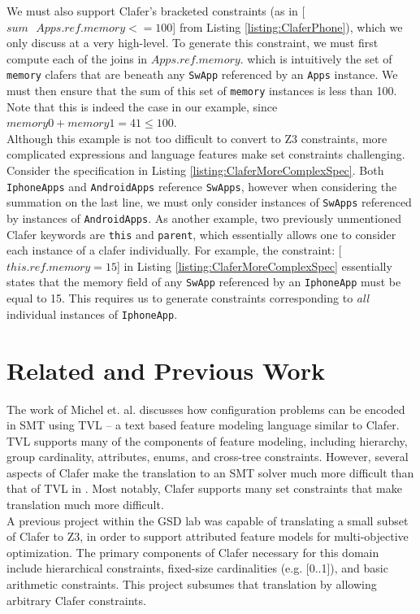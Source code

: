 \documentclass{article}
\begin{document}
We must also support Clafer's bracketed constraints (as in [$sum\text{ }Apps.ref.memory <= 100$] from Listing \ref{listing:ClaferPhone}), which we only discuss at a very high-level. To generate this constraint, we must first compute each of the joins in $Apps.ref.memory$. which is intuitively the set of \texttt{memory} clafers that are beneath any \texttt{SwApp} referenced by an \texttt{Apps} instance. We must then ensure that the sum of this set of \texttt{memory} instances is less than 100. Note that this is indeed the case in our example, since $memory0 + memory1 =   41 \le 100$.\\
\indent Although this example is not too difficult to convert to Z3 constraints, more complicated expressions and language features make set constraints challenging. Consider the specification in Listing \ref{listing:ClaferMoreComplexSpec}. Both \texttt{IphoneApps} and \texttt{AndroidApps} reference \texttt{SwApps}, however when considering the summation on the last line, we must only consider instances of \texttt{SwApps} referenced by instances of \texttt{AndroidApps}. As another example, two previously unmentioned Clafer keywords are \texttt{this} and \texttt{parent}, which essentially allows one to consider each instance of a clafer individually. For example, the constraint: [$this.ref.memory = 15$] in Listing \ref{listing:ClaferMoreComplexSpec}  essentially states that the memory field of any \texttt{SwApp} referenced by an \texttt{IphoneApp} must be equal to 15. This requires us to generate constraints corresponding to \textit{all} individual instances of \texttt{IphoneApp}.





\section{Related and Previous Work}
The work of Michel et. al. \cite{Michel2012} discusses how configuration problems can be encoded in SMT using TVL \cite{Classen2011} -- a text based feature modeling language similar to Clafer. TVL supports many of the components of feature modeling, including hierarchy, group cardinality, attributes, enums, and cross-tree constraints. However, several aspects of Clafer make the translation to an SMT solver much more difficult than that of TVL in \cite{Michel2012}. Most notably, Clafer supports many set constraints that make translation much more difficult. \\
\indent  A previous project \cite{Olaechea2013} within the GSD lab was capable of translating a small subset of Clafer to Z3, in order to support attributed feature models for multi-objective optimization. The primary components of Clafer necessary for this domain include hierarchical constraints, fixed-size cardinalities (e.g. [0..1]), and basic arithmetic constraints. This project subsumes that translation by allowing arbitrary Clafer constraints.
\end{document}
